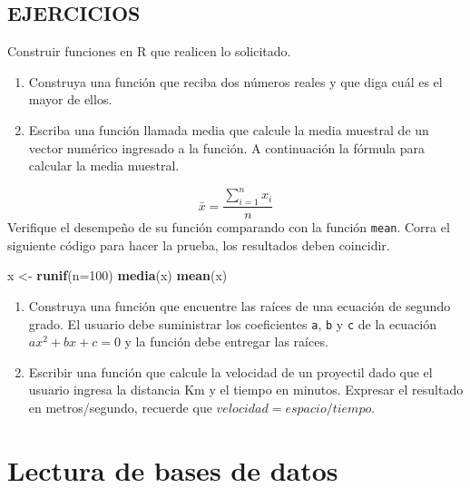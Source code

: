 \documentclass[10pt,]{krantz}
\makeatletter
\newenvironment{Shaded}{\begin{snugshade}}{\end{snugshade}}
\newcommand{\KeywordTok}[1]{\textcolor[rgb]{0.13,0.29,0.53}{\textbf{{#1}}}}
\newcommand{\DataTypeTok}[1]{\textcolor[rgb]{0.13,0.29,0.53}{{#1}}}
\newcommand{\DecValTok}[1]{\textcolor[rgb]{0.00,0.00,0.81}{{#1}}}
\newcommand{\StringTok}[1]{\textcolor[rgb]{0.31,0.60,0.02}{{#1}}}
\newcommand{\NormalTok}[1]{{#1}}
\let\proglang=\textsf
\newenvironment{kframe}{%
\medskip{}
\setlength{\fboxsep}{.8em}
 \def\at@end@of@kframe{}%
 \ifinner\ifhmode%
  \def\at@end@of@kframe{\end{minipage}}%
  \begin{minipage}{\columnwidth}%
 \fi\fi%
 \def\FrameCommand##1{\hskip\@totalleftmargin \hskip-\fboxsep
 \colorbox{shadecolor}{##1}\hskip-\fboxsep
     \hskip-\linewidth \hskip-\@totalleftmargin \hskip\columnwidth}%
 \MakeFramed {\advance\hsize-\width
   \@totalleftmargin\z@ \linewidth\hsize
   \@setminipage}}%
 {\par\unskip\endMakeFramed%
 \at@end@of@kframe}
\renewenvironment{Shaded}{\begin{kframe}}{\end{kframe}}
\makeatother
\begin{document}
\section*{EJERCICIOS}\label{ejercicios-2}


Construir funciones en \proglang{R} que realicen lo solicitado.

\begin{enumerate}
\def\labelenumi{\arabic{enumi}.}
\item
  Construya una función que reciba dos números reales y que diga cuál es
  el mayor de ellos.
\item
  Escriba una función llamada media que calcule la media muestral de un
  vector numérico ingresado a la función. A continuación la fórmula para
  calcular la media muestral.
\end{enumerate}

\[\bar{x}=\frac{\sum_{i=1}^n x_i}{n}\] Verifique el desempeño de su
función comparando con la función \texttt{mean}. Corra el siguiente
código para hacer la prueba, los resultados deben coincidir.

\begin{Shaded}
\begin{Highlighting}[]
\NormalTok{x <-}\StringTok{ }\KeywordTok{runif}\NormalTok{(}\DataTypeTok{n=}\DecValTok{100}\NormalTok{)}
\KeywordTok{media}\NormalTok{(x)}
\KeywordTok{mean}\NormalTok{(x)}
\end{Highlighting}
\end{Shaded}

\begin{enumerate}
\def\labelenumi{\arabic{enumi}.}
\setcounter{enumi}{2}
\item
  Construya una función que encuentre las raíces de una ecuación de
  segundo grado. El usuario debe suministrar los coeficientes
  \texttt{a}, \texttt{b} y \texttt{c} de la ecuación \(ax^2+bx+c=0\) y
  la función debe entregar las raíces.
\item
  Escribir una función que calcule la velocidad de un proyectil dado que
  el usuario ingresa la distancia Km y el tiempo en minutos. Expresar el
  resultado en metros/segundo, recuerde que
  \(velocidad = espacio / tiempo\).
\end{enumerate}

\chapter{\texorpdfstring{Lectura de bases de datos
}{Lectura de bases de datos }}\label{lectura-de-bases-de-datos}
\end{document}
